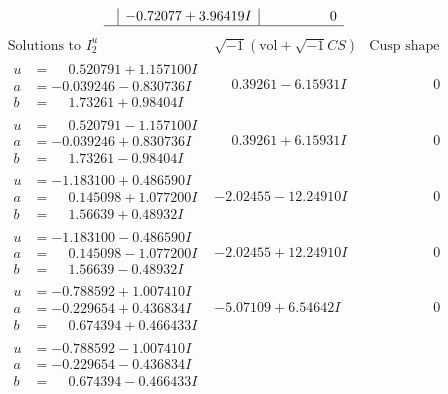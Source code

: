 \documentclass[1p]{elsarticle_modified}
\theoremstyle{definition}
\newcommand{\I}{\sqrt{-1}}
\begin{document}
$$\begin{array}{c|c|c}
 & -0.72077 + 3.96419 I & \phantom{-0.000000 } 0\\
 \hline 
 \end{array}$$\newpage$$\begin{array}{c|c|c}  
\text{Solutions to }I^u_{2}& \I (\text{vol} + \sqrt{-1}CS) & \text{Cusp shape}\\
 \hline 
\begin{aligned}
u &= \phantom{-}0.520791 + 1.157100 I \\
a &= -0.039246 - 0.830736 I \\
b &= \phantom{-}1.73261 + 0.98404 I\end{aligned}
 & \phantom{-}0.39261 - 6.15931 I & \phantom{-0.000000 } 0 \\ \hline\begin{aligned}
u &= \phantom{-}0.520791 - 1.157100 I \\
a &= -0.039246 + 0.830736 I \\
b &= \phantom{-}1.73261 - 0.98404 I\end{aligned}
 & \phantom{-}0.39261 + 6.15931 I & \phantom{-0.000000 } 0 \\ \hline\begin{aligned}
u &= -1.183100 + 0.486590 I \\
a &= \phantom{-}0.145098 + 1.077200 I \\
b &= \phantom{-}1.56639 + 0.48932 I\end{aligned}
 & -2.02455 - 12.24910 I & \phantom{-0.000000 } 0 \\ \hline\begin{aligned}
u &= -1.183100 - 0.486590 I \\
a &= \phantom{-}0.145098 - 1.077200 I \\
b &= \phantom{-}1.56639 - 0.48932 I\end{aligned}
 & -2.02455 + 12.24910 I & \phantom{-0.000000 } 0 \\ \hline\begin{aligned}
u &= -0.788592 + 1.007410 I \\
a &= -0.229654 + 0.436834 I \\
b &= \phantom{-}0.674394 + 0.466433 I\end{aligned}
 & -5.07109 + 6.54642 I & \phantom{-0.000000 } 0 \\ \hline\begin{aligned}
u &= -0.788592 - 1.007410 I \\
a &= -0.229654 - 0.436834 I \\
b &= \phantom{-}0.674394 - 0.466433 I\end{aligned}

\end{array}$$
\end{document}
